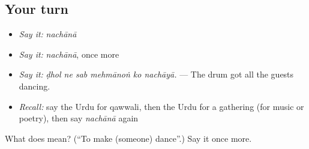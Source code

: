 \subsection*{Your turn}
\begin{itemize}
\raggedright
  \item \emph{Say it:} \emph{nachānā}
  \item \emph{Say it:} \emph{nachānā}, once more
  \item \emph{Say it:} \emph{ḍhol ne sab mehmānoṅ ko nachāyā.} — The drum got all the guests dancing.
  \item \emph{Recall:} say the Urdu for qawwali, then the Urdu for a gathering (for music or poetry), then say \emph{nachānā} again
\end{itemize}

\begin{tcolorbox}[breakable,colback=teal!4,colframe=teal!35!black,title={Before you move on}]
What does  mean? (\textquotedblleft{}To make (someone) dance\textquotedblright{}.) Say it once more.
\end{tcolorbox}
